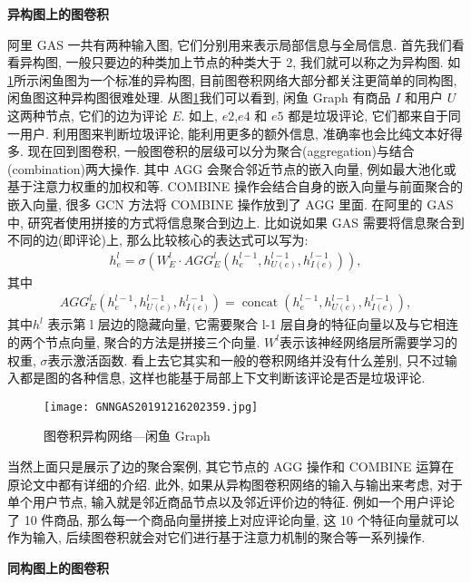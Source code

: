 \textbf{异构图上的图卷积}

阿里 GAS 一共有两种输入图, 它们分别用来表示局部信息与全局信息. 首先我们看看异构图, 一般只要边的种类加上节点的种类大于 2, 我们就可以称之为异构图. 如\ref{GNNGAS20191216202359}所示闲鱼图为一个标准的异构图, 目前图卷积网络大部分都关注更简单的同构图, 闲鱼图这种异构图很难处理.
从图\ref{GNNGAS20191216202359}我们可以看到, 闲鱼 Graph 有商品 $I$ 和用户 $U$ 这两种节点, 它们的边为评论 $E$. 如上, $e2$,$e4$ 和 $e5$ 都是垃圾评论, 它们都来自于同一用户. 利用图来判断垃圾评论, 能利用更多的额外信息, 准确率也会比纯文本好得多.
现在回到图卷积, 一般图卷积的层级可以分为聚合(aggregation)与结合(combination)两大操作. 其中 AGG 会聚合邻近节点的嵌入向量, 例如最大池化或基于注意力权重的加权和等. COMBINE 操作会结合自身的嵌入向量与前面聚合的嵌入向量, 很多 GCN 方法将 COMBINE 操作放到了 AGG 里面.  在阿里的 GAS 中, 研究者使用拼接的方式将信息聚合到边上. 比如说如果 GAS 需要将信息聚合到不同的边(即评论)上, 那么比较核心的表达式可以写为:
\begin{align}
    h_{e}^{l}=\sigma\left(W_{E}^{l} \cdot A G G_{E}^{l}\left(h_{e}^{l-1}, h_{U(e)}^{l-1}, h_{I(e)}^{l-1}\right)\right),
\end{align}
其中
\begin{align*}
    A G G_{E}^{l}\left(h_{e}^{l-1}, h_{U(e)}^{l-1}, h_{I(e)}^{l-1}\right)=\operatorname{concat}\left(h_{e}^{l-1}, h_{U(e)}^{l-1}, h_{I(e)}^{l-1}\right),
\end{align*}
其中$ h^l$ 表示第 l 层边的隐藏向量, 它需要聚合 l-1 层自身的特征向量以及与它相连的两个节点向量, 聚合的方法是拼接三个向量.
$W^l$表示该神经网络层所需要学习的权重, $\sigma$表示激活函数.
看上去它其实和一般的卷积网络并没有什么差别, 只不过输入都是图的各种信息, 这样也能基于局部上下文判断该评论是否是垃圾评论.
\begin{figure}[H]
\centering
\texttt{[image: GNNGAS20191216202359.jpg]}
\caption{图卷积异构网络---闲鱼 Graph}
\label{GNNGAS20191216202359}\vspace{-0.4cm}
\end{figure}
当然上面只是展示了边的聚合案例, 其它节点的 AGG 操作和 COMBINE 运算在原论文中都有详细的介绍.  此外, 如果从异构图卷积网络的输入与输出来考虑,
对于单个用户节点, 输入就是邻近商品节点以及邻近评价边的特征.
例如一个用户评论了 10 件商品, 那么每一个商品向量拼接上对应评论向量, 这 10 个特征向量就可以作为输入, 后续图卷积就会对它们进行基于注意力机制的聚合等一系列操作.

\textbf{同构图上的图卷积}

